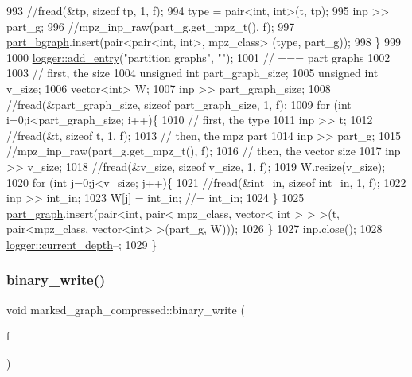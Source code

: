 \begin{DoxyCode}
993     \textcolor{comment}{//fread(&tp, sizeof tp, 1, f);}
994     type = pair<int, int>(t, tp);
995     inp >> part\_g;
996     \textcolor{comment}{//mpz\_inp\_raw(part\_g.get\_mpz\_t(), f);}
997     \hyperlink{classmarked__graph__compressed_a7b3267063fba30b45eb21b3ba4e07536}{part\_bgraph}.insert(pair<pair<int, int>, mpz\_class> (type, part\_g));
998   \}
999 
1000   \hyperlink{classlogger_a710163deb17bc81f70d53d285b8ac9ac}{logger::add\_entry}(\textcolor{stringliteral}{"partition graphs"}, \textcolor{stringliteral}{""});
1001   \textcolor{comment}{// === part graphs}
1002 
1003   \textcolor{comment}{// first, the size}
1004   \textcolor{keywordtype}{unsigned} \textcolor{keywordtype}{int} part\_graph\_size;
1005   \textcolor{keywordtype}{unsigned} \textcolor{keywordtype}{int} v\_size;
1006   vector<int> W; 
1007   inp >> part\_graph\_size;
1008   \textcolor{comment}{//fread(&part\_graph\_size, sizeof part\_graph\_size, 1, f);}
1009   \textcolor{keywordflow}{for} (\textcolor{keywordtype}{int} i=0;i<part\_graph\_size; i++)\{
1010     \textcolor{comment}{// first, the type}
1011     inp >> t; 
1012     \textcolor{comment}{//fread(&t, sizeof t, 1, f);}
1013     \textcolor{comment}{// then, the mpz part}
1014     inp >> part\_g;
1015     \textcolor{comment}{//mpz\_inp\_raw(part\_g.get\_mpz\_t(), f);}
1016     \textcolor{comment}{// then, the vector size}
1017     inp >> v\_size;
1018     \textcolor{comment}{//fread(&v\_size, sizeof v\_size, 1, f);}
1019     W.resize(v\_size);
1020     \textcolor{keywordflow}{for} (\textcolor{keywordtype}{int} j=0;j<v\_size; j++)\{
1021       \textcolor{comment}{//fread(&int\_in, sizeof int\_in, 1, f);}
1022       inp >> int\_in;
1023       W[j] = int\_in; \textcolor{comment}{//= int\_in;}
1024     \}
1025     \hyperlink{classmarked__graph__compressed_ae179a4737e6eab905c18a94d44ef64b7}{part\_graph}.insert(pair<\textcolor{keywordtype}{int}, pair< mpz\_class, vector< int > > >(t, pair<mpz\_class, vector<int>
       >(part\_g, W)));
1026   \}
1027   inp.close();
1028   \hyperlink{classlogger_a9d29b49bd318a719a8e85b59eac54fe0}{logger::current\_depth}--;
1029 \}
\end{DoxyCode}
\mbox{\label{classmarked__graph__compressed_ab9cdb7fc43badd58fb5202f74ffac723}} 
\subsubsection{\texorpdfstring{binary\+\_\+write()}{binary\_write()}\hspace{0.1cm}{\footnotesize\ttfamily [1/2]}}
{\footnotesize\ttfamily void marked\+\_\+graph\+\_\+compressed\+::binary\+\_\+write (\begin{DoxyParamCaption}\item[{F\+I\+LE $\ast$}]{f }\end{DoxyParamCaption})}



